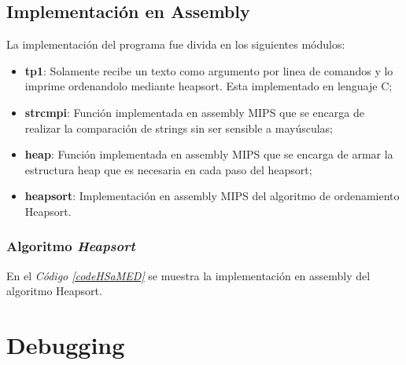 \documentclass{article}
\newcommand{\refcode}[1]{\textit{Código \ref{#1}}}
\begin{document}
\lstset{ language = C } %
 
\bigskip


\lstset{ language = C } %
 
\bigskip\bigskip
\newpage


\subsection{Implementación en Assembly}

	La implementación del programa fue divida en los siguientes módulos:
	\medskip

\begin{itemize}

\itemsep=2pt \topsep=0pt \partopsep=0pt \parskip=0pt \parsep=0pt
	\item \textbf{tp1}: Solamente recibe un texto como argumento por linea de comandos y lo imprime ordenandolo mediante heapsort. Esta implementado en lenguaje C;
	\item \textbf{strcmpi}: Función implementada en assembly MIPS que se encarga de realizar la comparación de strings sin ser sensible a mayúsculas;
	\item \textbf{heap}: Función implementada en assembly MIPS que se encarga de armar la estructura heap que es necesaria en cada paso del heapsort;
	\item \textbf{heapsort}: Implementación en assembly MIPS del algoritmo de ordenamiento Heapsort.

\end{itemize}	
\medskip




\subsubsection{Algoritmo \textit{Heapsort}}

	En el \refcode{codeHSaMED} se muestra la implementación en assembly del algoritmo Heapsort.

\lstset{ language = [mips]Assembler} %
 
\bigskip\bigskip\medskip



\section{Debugging}
	
\end{document}
